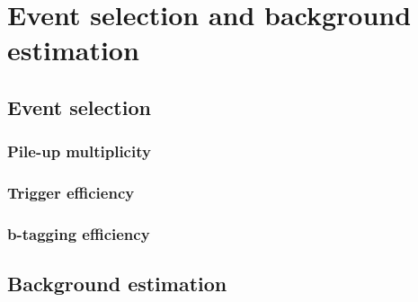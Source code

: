 
\chapter{Event selection and background estimation} %

\label{Chapter6} %



\section{Event selection}


\subsection{Pile-up multiplicity}


\subsection{Trigger efficiency}


\subsection{b-tagging efficiency}



\section{Background estimation}

